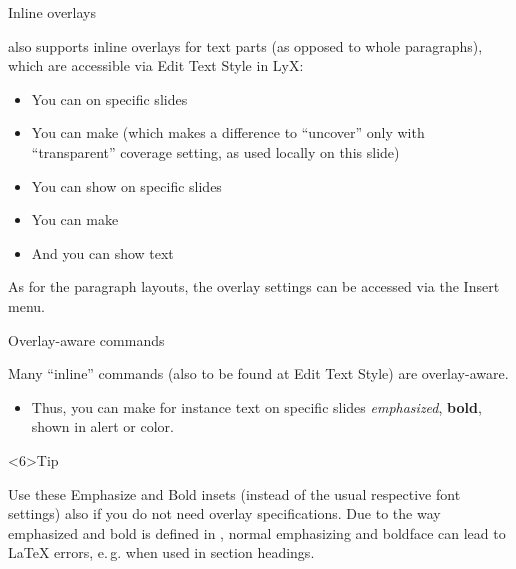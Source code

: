 \documentclass[english]{beamer}
\begin{document}
\begin{frame}{Inline overlays}


 also supports inline overlays for text parts (as
opposed to whole paragraphs), which are accessible via \alert{Edit \textrightarrow Text Style}
in LyX:
\begin{itemize}
\item You can   on specific slides
\item You can make   (which makes
a difference to ``uncover'' only with ``transparent'' coverage
setting, as used locally on this slide)
\item You can show  on specific slides
\item You can make  
\item And you can show  text
\end{itemize}
As for the paragraph layouts, the overlay settings can be accessed
via the \alert{Insert} menu.
\end{frame}
%
\begin{frame}{Overlay-aware commands}

Many ``inline'' commands (also to be found at \alert{Edit \textrightarrow Text Style})
are overlay-aware. 
\begin{itemize}
\item Thus, you can make for instance text on specific slides \emph<2>{emphasized},
\textbf<3>{bold}, shown in \alert<4>{alert} or 
color.
\end{itemize}
\begin{block}<6>{Tip}

Use these Emphasize and Bold insets (instead of the usual respective
font settings) also if you do not need overlay specifications. Due
to the way emphasized and bold is defined in ,
normal emphasizing and boldface can lead to \LaTeX{} errors, e.\,g.
when used in section headings.
\end{block}
\end{frame}
\end{document}
